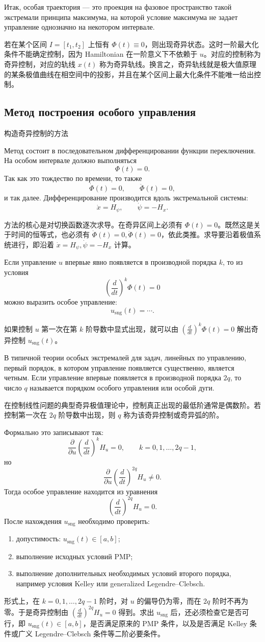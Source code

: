 \documentclass[12pt,a4paper]{article}
\newcommand{\sng}{\mathrm{sng}}
\newcommand{\zh}[1]{\par\noindent #1\par}
\begin{document}
Итак, особая траектория --- это проекция на фазовое пространство такой экстремали принципа максимума, на которой условие максимума не задает управление однозначно на некотором интервале.
\zh{若在某个区间 \(I=[t_1,t_2]\) 上恒有 \(\Phi(t)\equiv0\)，则出现奇异状态。这时一阶最大化条件不能确定控制，因为 Hamiltonian 在一阶意义下不依赖于 \(u\)。对应的控制称为奇异控制，对应的轨线 \(x(t)\) 称为奇异轨线。换言之，奇异轨线就是极大值原理的某条极值曲线在相空间中的投影，并且在某个区间上最大化条件不能唯一给出控制。}

\subsection*{Метод построения особого управления}
\zh{构造奇异控制的方法}
Метод состоит в последовательном дифференцировании функции переключения. На особом интервале должно выполняться
\[
\Phi(t)=0.
\]
Так как это тождество по времени, то также
\[
\dot\Phi(t)=0,\qquad \ddot\Phi(t)=0,
\]
и так далее. Дифференцирование производится вдоль экстремальной системы:
\[
\dot x=H_\psi,
\qquad
\dot\psi=-H_x.
\]
\zh{方法的核心是对切换函数逐次求导。在奇异区间上必须有 \(\Phi(t)=0\)。既然这是关于时间的恒等式，也必须有 \(\dot\Phi(t)=0,\ddot\Phi(t)=0\)，依此类推。求导要沿着极值系统进行，即沿着 \(\dot x=H_\psi,\dot\psi=-H_x\) 计算。}

Если управление $u$ впервые явно появляется в производной порядка $k$, то из условия
\[
\left(\frac{d}{dt}\right)^k\Phi(t)=0
\]
можно выразить особое управление:
\[
u_{\sng}(t)=\cdots.
\]
\zh{如果控制 \(u\) 第一次在第 \(k\) 阶导数中显式出现，就可以由 \(\left(\frac{d}{dt}\right)^k\Phi(t)=0\) 解出奇异控制 \(u_{\sng}(t)\)。}

В типичной теории особых экстремалей для задач, линейных по управлению, первый порядок, в котором управление появляется существенно, является четным. Если управление впервые появляется в производной порядка $2q$, то число $q$ называется порядком особого управления или особой дуги.
\zh{在控制线性问题的典型奇异极值理论中，控制真正出现的最低阶通常是偶数阶。若控制第一次在 \(2q\) 阶导数中出现，则 \(q\) 称为该奇异控制或奇异弧的阶。}

Формально это записывают так:
\[
\frac{\partial}{\partial u}
\left(\frac{d}{dt}\right)^k H_u=0,
\qquad k=0,1,\ldots,2q-1,
\]
но
\[
\frac{\partial}{\partial u}
\left(\frac{d}{dt}\right)^{2q}H_u\ne0.
\]
Тогда особое управление находится из уравнения
\[
\left(\frac{d}{dt}\right)^{2q}H_u=0.
\]
После нахождения $u_{\sng}$ необходимо проверить:
\begin{enumerate}
    \item допустимость: $u_{\sng}(t)\in[a,b]$;
    \item выполнение исходных условий PMP;
    \item выполнение дополнительных необходимых условий второго порядка, например условия Kelley или generalized Legendre--Clebsch.
\end{enumerate}
\zh{形式上，在 \(k=0,1,\ldots,2q-1\) 阶时，对 \(u\) 的偏导仍为零，而在 \(2q\) 阶时不再为零。于是奇异控制由 \(\left(\frac{d}{dt}\right)^{2q}H_u=0\) 得到。求出 \(u_{\sng}\) 后，还必须检查它是否可行，即 \(u_{\sng}(t)\in[a,b]\)，是否满足原来的 PMP 条件，以及是否满足 Kelley 条件或广义 Legendre--Clebsch 条件等二阶必要条件。}
\end{document}
